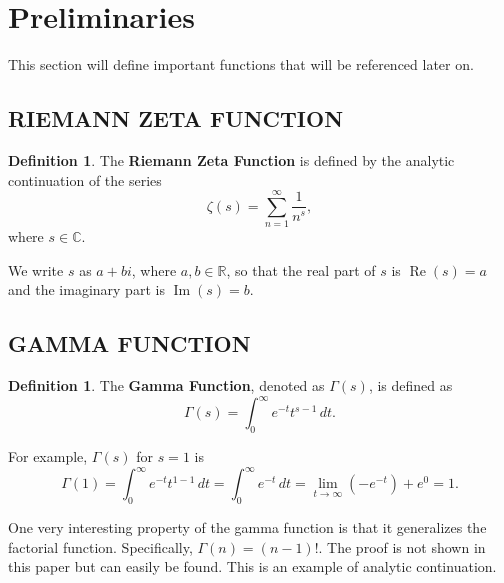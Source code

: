 \documentclass[12pt]{amsart} %
\theoremstyle{definition}
\newtheorem{definition}[thm]{Definition}
\theoremstyle{remark}
\numberwithin{equation}{section}
\begin{document}
\section{Preliminaries}
This section will define important functions that will be referenced later on.

\subsection{RIEMANN ZETA FUNCTION}
\begin{definition}
The \textbf{Riemann Zeta Function} is defined by the analytic continuation of the series
$$\zeta(s) = \sum_{n=1}^\infty \frac{1}{n^s},$$
where $s \in \mathbb{C}.$

We write $s$ as $a + bi$, where $a, b \in \mathbb{R}$, so that the real part of $s$ is $\operatorname{Re}(s) = a$ and the imaginary part is $\operatorname{Im}(s) = b$.
\end{definition}

\subsection{GAMMA FUNCTION}
\begin{definition}
The \textbf{Gamma Function}, denoted as $\Gamma(s)$, is defined as
$$\Gamma(s) = \int_{0}^\infty e^{-t}t^{s-1} \, dt.$$

For example, $\Gamma(s)$ for $s = 1$ is
$$\Gamma(1) = \int_{0}^\infty e^{-t}t^{1-1} \, dt = \int_{0}^\infty e^{-t} \, dt = \lim_{t \to \infty} (-e^{-t}) + e^0 = 1.$$

One very interesting property of the gamma function is that it generalizes the factorial function. Specifically, $\Gamma(n) = (n-1)!$. The proof is not shown in this paper but can easily be found. This is an example of analytic continuation.
\end{definition}
\end{document}
